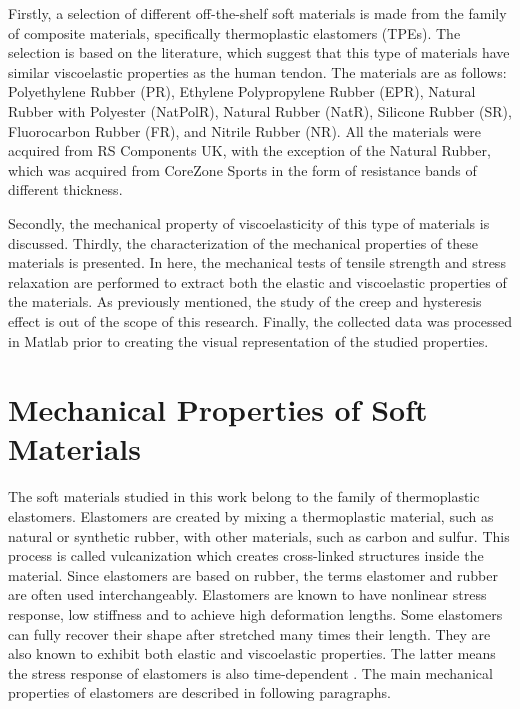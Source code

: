 Firstly, a selection of different off-the-shelf soft materials is made from the family of composite materials, specifically thermoplastic elastomers (TPEs). The selection is based on the literature, which suggest that this type of materials have similar viscoelastic properties as the human tendon. The materials are as follows: Polyethylene Rubber (PR), Ethylene Polypropylene Rubber (EPR), Natural Rubber with Polyester (NatPolR), Natural Rubber (NatR), Silicone Rubber (SR), Fluorocarbon Rubber (FR), and Nitrile Rubber (NR). All the materials were acquired from RS Components UK\textregistered{}, with the exception of the Natural Rubber, which was acquired from CoreZone Sports\textregistered{} in the form of resistance bands of different thickness.

Secondly, the mechanical property of viscoelasticity of this type of materials is discussed. Thirdly, the characterization of the mechanical properties of these materials is presented. In here, the mechanical tests of tensile strength and stress relaxation are performed to extract both the elastic and viscoelastic properties of the materials. As previously mentioned, the study of the creep and hysteresis effect is out of the scope of this research. Finally, the collected data was processed in Matlab\textregistered{} prior to creating the visual representation of the studied properties. 

\section{Mechanical Properties of Soft Materials} \label{sec:mechprop}

The soft materials studied in this work belong to the family of thermoplastic elastomers. Elastomers are created by mixing a thermoplastic material, such as natural or synthetic rubber, with other materials, such as carbon and sulfur. This process is called vulcanization which creates cross-linked structures inside the material. Since elastomers are based on rubber, the terms elastomer and rubber are often used interchangeably. Elastomers are known to have nonlinear stress response, low stiffness and to achieve high deformation lengths. Some elastomers can fully recover their shape after stretched many times their length. They are also known to exhibit both elastic and viscoelastic properties. The latter means the stress response of elastomers is also time-dependent \cite{Bauman2008}. The main mechanical properties of elastomers are described in following paragraphs.

